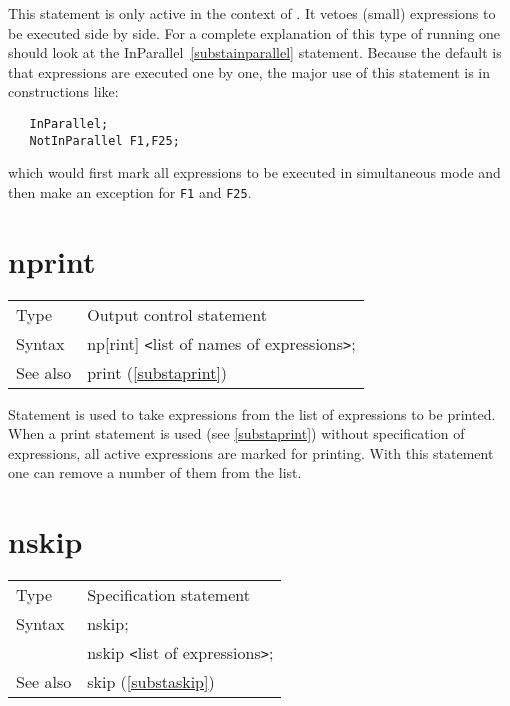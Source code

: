 \noindent This statement is only active in the context of 
\TFORM{}. It vetoes (small) expressions to be executed side by 
side. For a complete explanation of this type of running one should look at 
the InParallel~\ref{substainparallel} statement. Because the default is 
that expressions are executed one by one, the major use of this statement 
is in constructions like:
\begin{verbatim}
   InParallel;
   NotInParallel F1,F25;
\end{verbatim}
which would first mark all expressions to be executed in simultaneous mode 
and then make an exception for {\tt F1} and {\tt F25}.
\vspace{10mm}


\section{nprint}
\label{substanprint}

\noindent \begin{tabular}{ll}
Type & Output control statement\\
Syntax & np[rint] {\tt<}list of names of expressions{\tt>};
\\ See also & print (\ref{substaprint})
\end{tabular} \vspace{4mm}

\noindent Statement is used to take expressions from the list 
of expressions to be printed. When a print statement is used 
(see \ref{substaprint}) without specification of expressions, all active 
expressions are marked for printing. With this statement one can remove a 
number of them from the list. \vspace{10mm}


\section{nskip}
\label{substanskip}

\noindent \begin{tabular}{ll}
Type & Specification statement\\
Syntax & nskip; \\
       & nskip {\tt<}list of expressions{\tt>};
\\ See also & skip (\ref{substaskip})
\end{tabular} \vspace{4mm}


